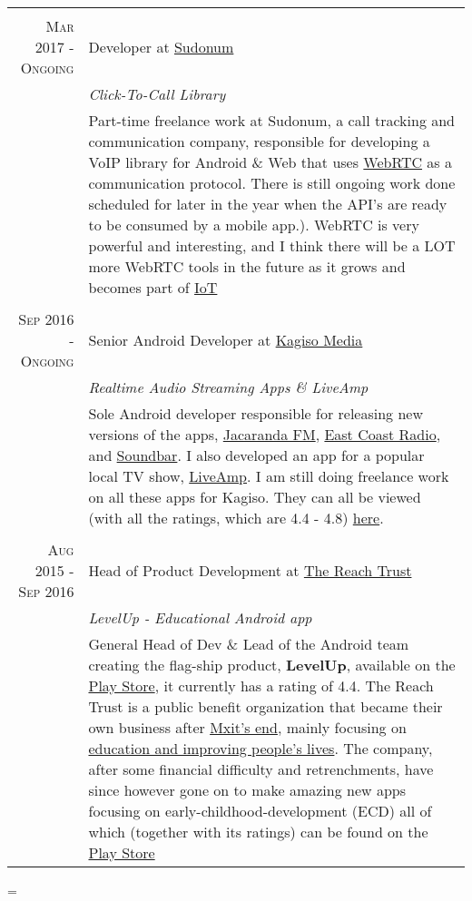 \documentclass[a4paper,10pt,notitlepage]{article}
\newenvironment{absolutelynopagebreak}
  {\par\nobreak\vfil\penalty0\vfilneg
   \vtop\bgroup}
  {\par\xdef\tpd{\the\prevdepth}\egroup
   \prevdepth=\tpd}
\begin{document}
\begin{absolutelynopagebreak}
\begin{tabular}{r|p{11cm}}
\multicolumn{2}{c}{} \\
\textsc{Mar 2017 - Ongoing} & Developer at \href{www.sudonum.com}{Sudonum} \\&\emph{Click-To-Call Library}\\&\footnotesize{Part-time freelance work at Sudonum, a call tracking and communication company, responsible for developing a VoIP library for Android \& Web that uses \href{https://en.wikipedia.org/wiki/WebRTC}{WebRTC} as a communication protocol. There is still ongoing work done scheduled for later in the year when the API's are ready to be consumed by a mobile app.). WebRTC is very powerful and interesting, and I think there will be a LOT more WebRTC tools in the future as it grows and becomes part of \href{https://en.wikipedia.org/wiki/Internet_of_things}{IoT}} \\

\multicolumn{2}{c}{} \\
\textsc{Sep 2016 - Ongoing} & Senior Android Developer at \href{www.kagisomedia.co.za}{Kagiso Media} \\&\emph{Realtime Audio Streaming Apps \& LiveAmp}\\&\footnotesize{Sole Android developer responsible for releasing new versions of the apps, \href{https://play.google.com/store/apps/details?id=com.kagiso.jacarandafm}{Jacaranda FM},  \href{https://play.google.com/store/apps/details?id=com.kagiso.ecr}{East Coast Radio}, and \href{https://play.google.com/store/apps/details?id=com.kagiso.soundbar}{Soundbar}. I also developed an app for a popular local TV show, \href{https://play.google.com/store/apps/details?id=com.kagiso.liveamp}{LiveAmp}. I am still doing freelance work on all these apps for Kagiso. They can all be viewed (with all the ratings, which are 4.4 - 4.8) \href{https://play.google.com/store/apps/developer?id=Kagiso+Media}{here}}. \\

 \multicolumn{2}{c}{} \\
 \textsc{Aug 2015 - Sep 2016} & Head of Product Development at \href{www.thereachtrust.org}{The Reach Trust} \\&\emph{LevelUp -  Educational Android app}\\&\footnotesize{General Head of Dev \& Lead of the Android team creating the  flag-ship product, \textbf{LevelUp}, available on the \href{https://play.google.com/store/apps/details?id=org.mylevelup}{Play Store}, it currently has a rating of 4.4. The Reach Trust is a public benefit organization that became their own business after \href{https://memeburn.com/2015/10/mxit-confirms-its-shutting-up-shop/}{Mxit's end}, mainly focusing on \href{https://it-online.co.za/2015/10/26/reach-trust-will-use-mxit-for-education/}{education and improving people's lives}. The company, after some financial difficulty and retrenchments, have since however gone on to make amazing new apps focusing on early-childhood-development (ECD) all of which (together with its ratings) can be found on the \href{https://play.google.com/store/apps/dev?id=7356513661681471434}{Play Store}} \\
 

\end{tabular}
\end{absolutelynopagebreak}
\end{document}
